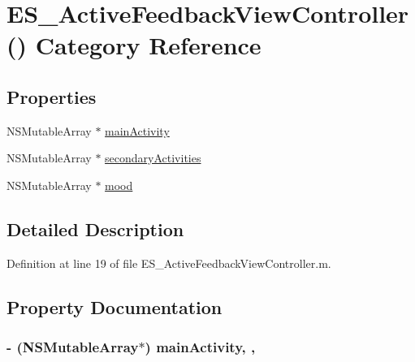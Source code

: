 \hypertarget{category_e_s___active_feedback_view_controller_07_08}{\section{E\+S\+\_\+\+Active\+Feedback\+View\+Controller() Category Reference}
\label{category_e_s___active_feedback_view_controller_07_08}
}
\subsection*{Properties}
\begin{DoxyCompactItemize}
\item 
N\+S\+Mutable\+Array $\ast$ \hyperlink{category_e_s___active_feedback_view_controller_07_08_a0699f02b894cf6930f61e25d65366ab1}{main\+Activity}
\item 
N\+S\+Mutable\+Array $\ast$ \hyperlink{category_e_s___active_feedback_view_controller_07_08_a4c9d5fe2285d36b52a7d99643f0ded0b}{secondary\+Activities}
\item 
N\+S\+Mutable\+Array $\ast$ \hyperlink{category_e_s___active_feedback_view_controller_07_08_ac338e9eeb12c2d6560270939aa2565b0}{mood}
\end{DoxyCompactItemize}


\subsection{Detailed Description}


Definition at line 19 of file E\+S\+\_\+\+Active\+Feedback\+View\+Controller.\+m.



\subsection{Property Documentation}
\hypertarget{category_e_s___active_feedback_view_controller_07_08_a0699f02b894cf6930f61e25d65366ab1}{
\subsubsection[{main\+Activity}]{\setlength{\rightskip}{0pt plus 5cm}-\/ (N\+S\+Mutable\+Array$\ast$) main\+Activity\hspace{0.3cm}{\ttfamily [read]}, {\ttfamily [write]}, {\ttfamily [atomic]}}}\label{category_e_s___active_feedback_view_controller_07_08_a0699f02b894cf6930f61e25d65366ab1}


